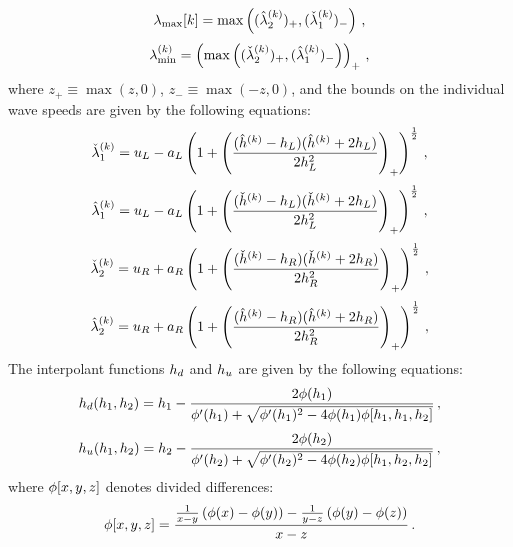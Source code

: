 \begin{equation}\label{eq:maxwavespeedbound}
  \lambda_{\text{max}}[k] = \max\left((\hat{\lambda}_2^{(k)})_+,
    (\check{\lambda}_1^{(k)})_-\right)
  \,,
\end{equation}
\begin{equation}\label{eq:minwavespeedbound}
  \lambda_{\text{min}}^{(k)} = \left(\max\left((\check{\lambda}_2^{(k)})_+,
    (\hat{\lambda}_1^{(k)})_-\right)\right)_+
  \,,
\end{equation}
where $z_+\equiv\max(z,0)$, $z_-\equiv\max(-z,0)$, and the bounds on the individual
wave speeds are given by the following equations:
\begin{equation}
  \check{\lambda}_1^{(k)}
    = u_L - a_L\left(1 + \left(
    \frac{(\hat{h}^{(k)} - h_L)(\hat{h}^{(k)}
    + 2h_L)}{2h_L^2}\right)_+\right)^{\frac{1}{2}}
    \,,
\end{equation}
\begin{equation}
  \hat{\lambda}_1^{(k)}
    = u_L - a_L\left(1 + \left(
    \frac{(\check{h}^{(k)} - h_L)(\check{h}^{(k)}
    + 2h_L)}{2h_L^2}\right)_+\right)^{\frac{1}{2}}
    \,,
\end{equation}
\begin{equation}
  \check{\lambda}_2^{(k)}
    = u_R + a_R\left(1 + \left(
    \frac{(\check{h}^{(k)} - h_R)(\check{h}^{(k)}
    + 2h_R)}{2h_R^2}\right)_+\right)^{\frac{1}{2}}
    \,,
\end{equation}
\begin{equation}
  \hat{\lambda}_2^{(k)}
    = u_R + a_R\left(1 + \left(
    \frac{(\hat{h}^{(k)} - h_R)(\hat{h}^{(k)}
    + 2h_R)}{2h_R^2}\right)_+\right)^{\frac{1}{2}}
    \,,
\end{equation}
The interpolant functions $h_d$ and $h_u$ are given by
the following equations:
\begin{equation}
  h_d(h_1,h_2) = h_1
    - \frac{2\phi(h_1)}{\phi'(h_1)
    + \sqrt{\phi'(h_1)^2 - 4\phi(h_1)\phi[h_1,h_1,h_2]}}
  \,,
\end{equation}
\begin{equation}
  h_u(h_1,h_2) = h_2
    - \frac{2\phi(h_2)}{\phi'(h_2)
    + \sqrt{\phi'(h_2)^2 - 4\phi(h_2)\phi[h_1,h_2,h_2]}}
  \,,
\end{equation}
where $\phi[x,y,z]$ denotes divided differences:
\begin{equation}
  \phi[x,y,z] = \frac{\frac{1}{x-y}\left(\phi(x)-\phi(y)\right)
    - \frac{1}{y-z}\left(\phi(y)-\phi(z)\right)}{x-z}
  \,.
\end{equation}

\pagebreak{}
